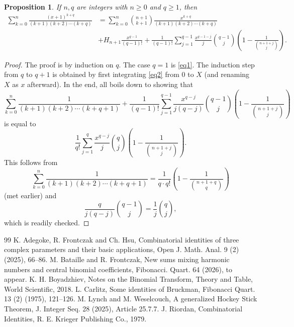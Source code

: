 \documentclass[10pt,a4paper]{amsart}
\numberwithin{equation}{section}
\newtheorem{proposition}[thm]{Proposition}
\begin{document}
\begin{proposition}
If $n,q$ are integers with $n\ge 0$ and $q\ge 1$, then
\begin{align}\label{eq2}
\sum_{k=0}^n \frac{(x+1)^{k+q}}{(k+1)(k+2)\cdots (k+q)} &= \sum_{k=0}^n \binom{n+1}{k+1}\frac{x^{k+q}}{(k+1)(k+2)\cdots (k+q)} \nonumber \\
& + H_{n+1}\frac{x^{q-1}}{(q-1)!} + \frac{1}{(q-1)!}\sum_{j=1}^{q-1}\frac{x^{q-1-j}}{j}\binom{q-1}{j}\left(1-\frac{1}{\binom{n+1+j}{j}}\right).
\end{align}
\end{proposition}
\begin{proof}
The proof is by induction on $q$. The case $q=1$ is \eqref{eq1}. The induction step from $q$ to $q+1$ is obtained by first integrating \eqref{eq2} from $0$ to $X$ (and renaming $X$ as $x$ afterward). In the end, all boils down to showing that 
\[\sum_{k=0}^n\frac{1}{(k+1)(k+2)\cdots (k+q+1)}+\frac{1}{(q-1)!}\sum_{j=1}^{q-1}\frac{x^{q-j}}{j(q-j)}\binom{q-1}{j}\left(1-\frac{1}{\binom{n+1+j}{j}}\right)\]
is equal to
\[\frac{1}{q!}\sum_{j=1}^q\frac{x^{q-j}}{j}\binom{q}{j}\left(1-\frac{1}{\binom{n+1+j}{j}}\right).\]
This follows from 
$$\sum_{k=0}^n\frac{1}{(k+1)(k+2)\cdots (k+q+1)} = \frac{1}{q\cdot q!}\left(1-\frac{1}{\binom{n+1+q}{q}}\right)$$ 
(met earlier) and 
$$\frac{q}{j(q-j)} \binom{q-1}{j} = \frac{1}{j}\binom{q}{j},$$ 
which is readily checked.
\end{proof}

\begin{thebibliography}{99}
 K. Adegoke, R. Frontczak and Ch. Hsu, Combinatorial identities of three complex parameters and their basic applications, Open J. Math. Anal. 9 (2) (2025), 66--86.
 M. Bataille and R. Frontczak, New sums mixing harmonic numbers and central binomial coefficients, Fibonacci. Quart. 64 (2026), to appear.
 K. H. Boyadzhiev, Notes on the Binomial Transform, Theory and Table, World Scientific, 2018.
 L. Carlitz, Some identities of Bruckman, Fibonacci Quart. 13 (2) (1975), 121--126.
 M. Lynch and M. Weselcouch, A generalized Hockey Stick Theorem, J. Integer Seq. 28 (2025), Article 25.7.7.
 J. Riordan, Combinatorial Identities, R. E. Krieger Publishing Co., 1979.
\end{thebibliography}
\end{document}
